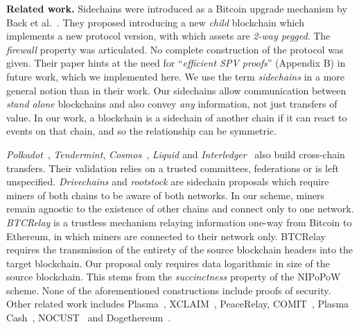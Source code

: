 
\noindent\textbf{Related work. }
Sidechains were introduced as a Bitcoin upgrade mechanism by Back et
al.~\cite{sidechains}. They proposed introducing a new \emph{child} blockchain
which implements a new protocol version, with which assets are \emph{2-way
pegged}. The \emph{firewall} property was articulated. No complete construction
of the protocol was given. Their paper hints at the need for ``\emph{efficient
SPV proofs}'' (Appendix B) in future work, which we implemented here. We use the
term \emph{sidechains} in a more general notion than in their work. Our
sidechains allow communication between \emph{stand alone} blockchains and also
convey \emph{any} information, not just transfers of value. In our work, a
blockchain is a sidechain of another chain if it can react to events on that
chain, and so the relationship can be symmetric.

\emph{Polkadot}~\cite{polkadot}, \emph{Tendermint},
\emph{Cosmos}~\cite{tendermint}, \emph{Liquid} and
\emph{Interledger}~\cite{interledger} also build cross-chain transfers. Their
validation relies on a trusted committees, federations or is left unspecified.
\emph{Drivechains} and \emph{rootstock} are sidechain proposals which require
miners of both chains to be aware of both networks. In our scheme, miners remain
agnostic to the existence of other chains and connect only to one network.
\emph{BTCRelay} is a trustless mechanism relaying information one-way from
Bitcoin to Ethereum, in which miners are connected to their network only.
BTCRelay requires the transmission of the entirety of the source blockchain
headers into the target blockchain. Our proposal only requires data logarithmic
in size of the source blockchain. This stems from the \emph{succinctness}
property of the NIPoPoW scheme.
None of the aforementioned constructions include
proofs of security.
Other related work includes Plasma~\cite{plasma},
XCLAIM~\cite{xclaim}, PeaceRelay, COMIT~\cite{comit}, Plasma Cash~\cite{plasmacash},
NOCUST~\cite{nocust} and Dogethereum~\cite{dogethereum}.
